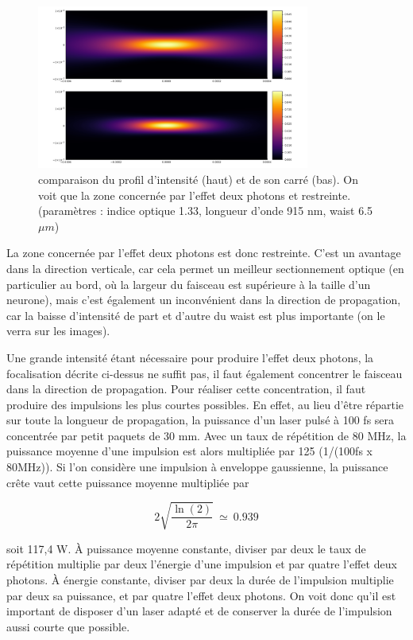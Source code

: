 \begin{figure}
\centering
\includegraphics[width=0.8\textwidth]{./files/profile-intensity.png}
\caption{
comparaison du profil d'intensité (haut) et de son carré (bas). On voit que la zone concernée par l'effet deux photons et restreinte. (paramètres : indice optique 1.33, longueur d'onde 915 nm, waist 6.5 $\mu m$)
}
\end{figure}

La zone concernée par l'effet deux photons est donc restreinte. C'est un avantage dans la direction verticale, car cela permet un meilleur sectionnement optique (en particulier au bord, où la largeur du faisceau est supérieure à la taille d'un neurone), mais c'est également un inconvénient dans la direction de propagation, car la baisse d'intensité de part et d'autre du waist est plus importante (on le verra sur les images).

Une grande intensité étant nécessaire pour produire l'effet deux photons, la focalisation décrite ci-dessus ne suffit pas, il faut également concentrer le faisceau dans la direction de propagation. Pour réaliser cette concentration, il faut produire des impulsions les plus courtes possibles. En effet, au lieu d'être répartie sur toute la longueur de propagation, la puissance d'un laser pulsé à 100 fs sera concentrée par petit paquets de 30 mm. Avec un taux de répétition de 80 MHz, la puissance moyenne d'une impulsion est alors multipliée par 125 (1/(100fs x 80MHz)). Si l'on considère une impulsion à enveloppe gaussienne, la puissance crête vaut cette puissance moyenne multipliée par 

$$
2\sqrt{\frac{\ln(2)}{2\pi}} \ \simeq \ 0.939
$$

soit 117,4 W. À puissance moyenne constante, diviser par deux le taux de répétition multiplie par deux l'énergie d'une impulsion et par quatre l'effet deux photons. À énergie constante, diviser par deux la durée de l'impulsion multiplie par deux sa puissance, et par quatre l'effet deux photons. On voit donc qu'il est important de disposer d'un laser adapté et de conserver la durée de l'impulsion aussi courte que possible.

